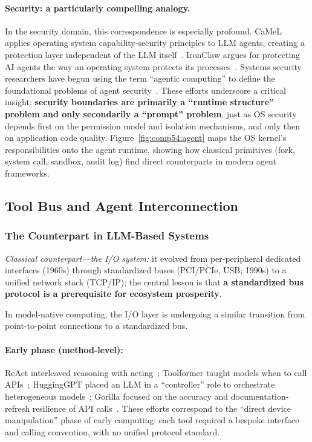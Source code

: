 \paragraph{Security: a particularly compelling analogy.}
In the security domain, this correspondence is especially profound.
CaMeL applies operating system capability-security principles to LLM agents, creating a protection layer independent of the LLM itself~\cite{debenedetti2025camel}.
IronClaw argues for protecting AI agents the way an operating system protects its processes~\cite{ironclaw2025}.
Systems security researchers have begun using the term ``agentic computing'' to define the foundational problems of agent security~\cite{agenticsecurity2025}.
These efforts underscore a critical insight: \textbf{security boundaries are primarily a ``runtime structure'' problem and only secondarily a ``prompt'' problem}, just as OS security depends first on the permission model and isolation mechanisms, and only then on application code quality.
Figure~\ref{fig:comp54:agent} maps the OS kernel's responsibilities onto the agent runtime, showing how classical primitives (fork, system call, sandbox, audit log) find direct counterparts in modern agent frameworks.



\subsection{Tool Bus and Agent Interconnection}
\label{sec:io}

\subsubsection{The Counterpart in LLM-Based Systems}

\textit{Classical counterpart---the I/O system:} it evolved from per-peripheral dedicated interfaces (1960s) through standardized buses (PCI/PCIe, USB; 1990s) to a unified network stack (TCP/IP); the central lesson is that \textbf{a standardized bus protocol is a prerequisite for ecosystem prosperity}.

In model-native computing, the I/O layer is undergoing a similar transition from point-to-point connections to a standardized bus.

\paragraph{Early phase (method-level):}
ReAct interleaved reasoning with acting~\cite{yao2023react}; Toolformer taught models when to call APIs~\cite{schick2023toolformer}; HuggingGPT placed an LLM in a ``controller'' role to orchestrate heterogeneous models~\cite{hugginggpt2023}; Gorilla focused on the accuracy and documentation-refresh resilience of API calls~\cite{patil2024gorilla}.
These efforts correspond to the ``direct device manipulation'' phase of early computing: each tool required a bespoke interface and calling convention, with no unified protocol standard.

